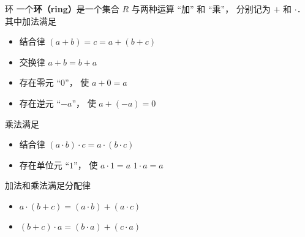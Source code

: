 
\begin{definition}{环}
一个\textbf{环（ring）}是一个集合 $R$ 与两种运算 “加” 和 “乘”， 分别记为 $+$ 和 $\cdot$． 其中加法满足 
\begin{itemize}
\item 结合律 $(a + b) = c = a + (b + c)$
\item 交换律 $a + b = b + a$
\item 存在零元 “$0$”， 使 $a + 0 = a$
\item 存在逆元 “$-a$”， 使 $a + (-a) = 0$
\end{itemize}
乘法满足
\begin{itemize}
\item 结合律 $(a\cdot b)\cdot c = a \cdot (b \cdot c)$
\item 存在单位元 “$1$”， 使 $a \cdot 1 = a$ $1 \cdot a = a$
\end{itemize}
加法和乘法满足分配律
\begin{itemize}
\item $a \cdot (b + c) = (a \cdot b) + (a \cdot c)$
\item $(b + c) \cdot a = (b \cdot a) + (c \cdot a)$
\end{itemize}
\end{definition}
